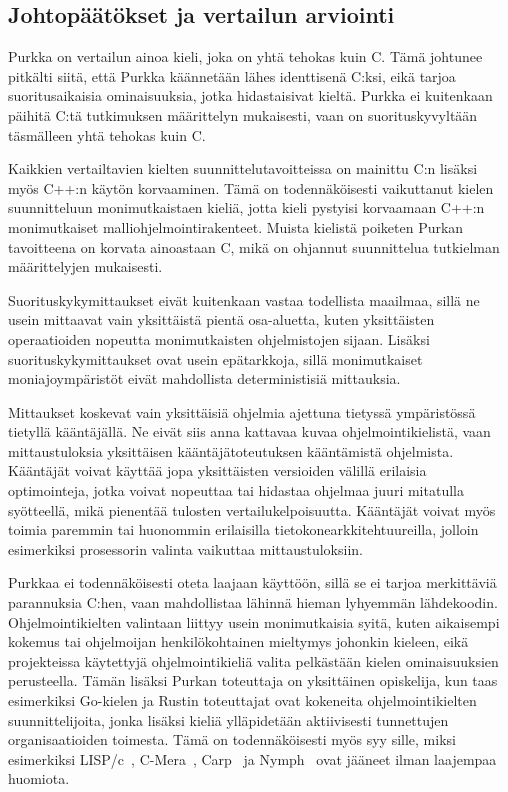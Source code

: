 \FloatBarrier

\subsection{Johtopäätökset ja vertailun arviointi}

Purkka on vertailun ainoa kieli, joka on yhtä tehokas kuin C. Tämä johtunee
pitkälti siitä, että Purkka käännetään lähes identtisenä C:ksi, eikä tarjoa
suoritusaikaisia ominaisuuksia, jotka hidastaisivat kieltä. Purkka ei kuitenkaan
päihitä C:tä tutkimuksen määrittelyn mukaisesti, vaan on suorituskyvyltään
täsmälleen yhtä tehokas kuin C.

Kaikkien vertailtavien kielten suunnittelutavoitteissa on mainittu C:n lisäksi
myös C++:n käytön korvaaminen. Tämä on todennäköisesti vaikuttanut kielen
suunnitteluun monimutkaistaen kieliä, jotta kieli pystyisi korvaamaan C++:n
monimutkaiset malliohjelmointirakenteet. Muista kielistä poiketen Purkan
tavoitteena on korvata ainoastaan C, mikä on ohjannut suunnittelua tutkielman
määrittelyjen mukaisesti.

Suorituskykymittaukset eivät kuitenkaan vastaa todellista maailmaa, sillä ne
usein mittaavat vain yksittäistä pientä osa-aluetta, kuten yksittäisten
operaatioiden nopeutta monimutkaisten ohjelmistojen sijaan. Lisäksi
suorituskykymittaukset ovat usein epätarkkoja, sillä monimutkaiset
moniajoympäristöt eivät mahdollista deterministisiä mittauksia.

Mittaukset koskevat vain yksittäisiä ohjelmia ajettuna tietyssä ympäristössä
tietyllä kääntäjällä. Ne eivät siis anna kattavaa kuvaa ohjelmointikielistä,
vaan mittaustuloksia yksittäisen kääntäjätoteutuksen kääntämistä ohjelmista.
Kääntäjät voivat käyttää jopa yksittäisten versioiden välillä erilaisia
optimointeja, jotka voivat nopeuttaa tai hidastaa ohjelmaa juuri mitatulla
syötteellä, mikä pienentää tulosten vertailukelpoisuutta. Kääntäjät voivat
myös toimia paremmin tai huonommin erilaisilla tietokonearkkitehtuureilla,
jolloin esimerkiksi prosessorin valinta vaikuttaa mittaustuloksiin.

Purkkaa ei todennäköisesti oteta laajaan käyttöön, sillä se ei tarjoa
merkittäviä parannuksia C:hen, vaan mahdollistaa lähinnä hieman lyhyemmän
lähdekoodin. Ohjelmointikielten valintaan liittyy usein monimutkaisia syitä,
kuten aikaisempi kokemus tai ohjelmoijan henkilökohtainen mieltymys johonkin
kieleen, eikä projekteissa käytettyjä ohjelmointikieliä valita pelkästään
kielen ominaisuuksien perusteella. Tämän lisäksi Purkan toteuttaja on
yksittäinen opiskelija, kun taas esimerkiksi Go-kielen ja Rustin toteuttajat
ovat kokeneita ohjelmointikielten suunnittelijoita, jonka lisäksi kieliä
ylläpidetään aktiivisesti tunnettujen organisaatioiden toimesta. Tämä on
todennäköisesti myös syy sille, miksi esimerkiksi LISP/c~\citep{clisp1},
C-Mera~\citep{clisp2}, Carp~\citep{clisp3} ja Nymph~\citep{nymph} ovat jääneet
ilman laajempaa huomiota.

